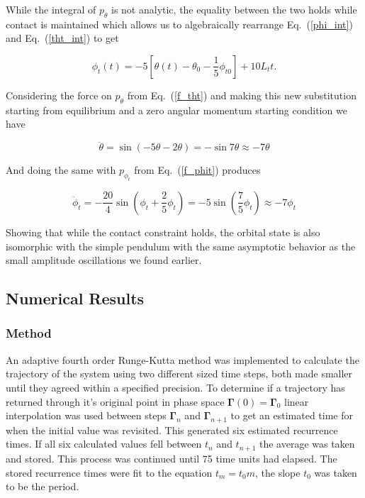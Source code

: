 \documentclass[prbg,preprint]{revtex4-1}
\begin{document}
While the integral of $p_\theta$ is not analytic, the equality between the two holds while contact is maintained which allows us to algebraically rearrange Eq.~(\ref{phi_int}) and Eq.~(\ref{tht_int}) to get

\begin{equation}
	\phi_t(t)=  -5
	\left[
	\theta(t)-\theta_{0}-\frac{1}{5}\phi_{t0}
	\right] 
	+ 10L_t t .
\end{equation}

Considering the force on $p_\theta$ from Eq.~(\ref{f_tht}) and making this new substitution starting from equilibrium and a zero angular momentum starting condition we have

\begin{equation}
	\ddot \theta = \sin(-5\theta -2\theta) = -\sin 7\theta \approx -7\theta
\end{equation}

And doing the same with $p_{\phi_t}$ from Eq.~(\ref{f_phit}) produces

\begin{equation}
	\ddot \phi_t = -\frac{20}{4}\sin(\phi_t +\frac{2}{5}\phi_t) =  -5\sin\left ( \frac{7}{5}\phi_t \right )\approx -7\phi_t
\end{equation}

Showing that while the contact constraint holds, the orbital state is also isomorphic with the simple pendulum with the same asymptotic behavior as the small amplitude oscillations we found earlier.

\subsection{Numerical Results}
\subsubsection{Method}
An adaptive fourth order Runge-Kutta method was implemented to calculate the trajectory of the system using two different sized time steps, both made smaller until they agreed within a specified precision. To determine if a trajectory has returned through it's original point in phase space $\boldsymbol{\Gamma}(0)=\boldsymbol{\Gamma}_0$ linear interpolation was used between steps $\boldsymbol{\Gamma}_n$ and $\boldsymbol{\Gamma}_{n+1}$ to get an estimated time for when the initial value was revisited. This generated six estimated recurrence times. If all six calculated values fell between $t_n$ and $t_{n+1}$ the average was taken and stored. This process was continued until 75 time units had elapsed. The stored recurrence times were fit to the equation $t_m = t_0m$, the slope $t_0$ was taken to be the period.
\end{document}
